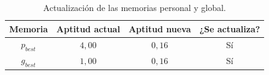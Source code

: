 \begin{table}[H]
\centering
\small
\setlength{\tabcolsep}{6pt}
\renewcommand{\arraystretch}{1.15}
\begin{tabular}{|c|c|c|c|}
\hline
\rowcolor{encabezado}\textbf{Memoria} & \textbf{Aptitud actual} & \textbf{Aptitud nueva} & \textbf{¿Se actualiza?} \\
\hline
$p_{best}$ & $4{,}00$ & $0{,}16$ & Sí \\
\hline
$g_{best}$ & $1{,}00$ & $0{,}16$ & Sí \\
\hline
\end{tabular}
\caption{Actualización de las memorias personal y global.}
\label{tab:p5a-memorias}
\end{table}
